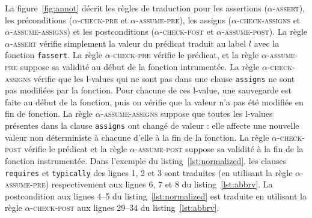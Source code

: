 La figure~\ref{fig:annot} décrit les règles de traduction pour les assertions
(\textsc{$\alpha$-assert}), les préconditions (\textsc{$\alpha$-check-pre} et
\textsc{$\alpha$-assume-pre}), les assigns (\textsc{$\alpha$-check-assigns} et
\textsc{$\alpha$-assume-assigns}) et les postconditions
(\textsc{$\alpha$-check-post} et \textsc{$\alpha$-assume-post}).
La règle \textsc{$\alpha$-assert} vérifie simplement la valeur du prédicat
traduit au label $l$ avec la fonction \lstinline'fassert'.
La règle \textsc{$\alpha$-check-pre} vérifie le prédicat, et la règle
\textsc{$\alpha$-assume-pre} suppose sa validité au début de la fonction
intrumentée.
La règle \textsc{$\alpha$-check-assigns} vérifie que les l-values qui ne sont
pas dans une clause \lstinline'assigns' ne sont pas modifiées par la fonction.
Pour chacune de ces l-value, une sauvegarde est faite au début de la fonction,
puis on vérifie que la valeur n'a pas été modifiée en fin de fonction.
La règle \textsc{$\alpha$-assume-assigns} suppose que toutes les l-values
présentes dans la clause \lstinline'assigns' ont changé de valeur : elle affecte
une nouvelle valeur non déterministe à chacune d'elle à la fin de la fonction.
La règle \textsc{$\alpha$-check-post} vérifie le prédicat et la règle
\textsc{$\alpha$-assume-post} suppose sa validité à la fin de la fonction
instrumentée.
Dans l'exemple du listing~\ref{lst:normalized}, les clauses \lstinline'requires'
et \lstinline'typically' des lignes 1, 2 et 3 sont traduites (en utilisant la
règle \textsc{$\alpha$-assume-pre}) respectivement aux lignes 6, 7 et 8 du
listing~\ref{lst:abbrv}.
La postcondition aux lignes 4--5 du listing~\ref{lst:normalized} est traduite
en utilisant la règle \textsc{$\alpha$-check-post} aux lignes 29--34 du
listing~\ref{lst:abbrv}.

